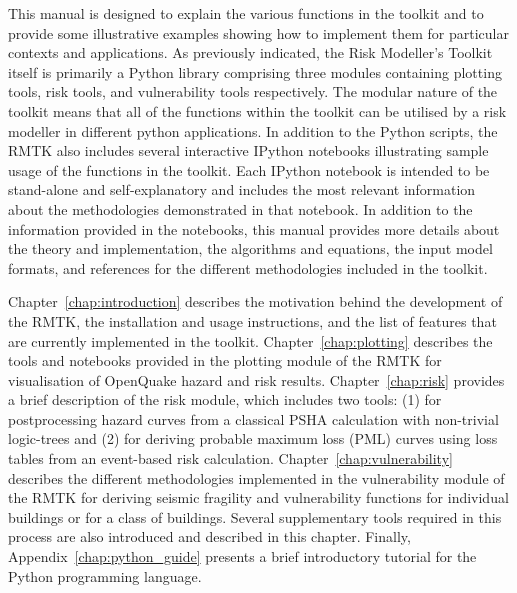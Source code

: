 This manual is designed to explain the various functions in the toolkit and to provide some illustrative examples showing how to implement them for particular contexts and applications. As previously indicated, the Risk Modeller’s Toolkit itself is primarily a Python library comprising three modules containing plotting tools, risk tools, and vulnerability tools respectively. The modular nature of the toolkit means that all of the functions within the toolkit can be utilised by a risk modeller in different python applications. In addition to the Python scripts, the RMTK also includes several interactive IPython notebooks illustrating sample usage of the functions in the toolkit. Each IPython notebook is intended to be stand-alone and self-explanatory and includes the most relevant information about the methodologies demonstrated in that notebook. In addition to the information provided in the notebooks, this manual provides more details about the theory and implementation, the algorithms and equations, the input model formats, and references for the different methodologies included in the toolkit.

Chapter~\ref{chap:introduction} describes the motivation behind the development of the RMTK, the installation and usage instructions, and the list of features that are currently implemented in the toolkit. Chapter~\ref{chap:plotting} describes the tools and notebooks provided in the plotting module of the RMTK for visualisation of OpenQuake hazard and risk results. Chapter~\ref{chap:risk} provides a brief description of the risk module, which includes two tools: (1) for postprocessing hazard curves from a classical PSHA calculation with non-trivial logic-trees and (2) for deriving probable maximum loss (PML) curves using loss tables from an event-based risk calculation. Chapter~\ref{chap:vulnerability} describes the different methodologies implemented in the vulnerability module of the RMTK for deriving seismic fragility and vulnerability functions for individual buildings or for a class of buildings. Several supplementary tools required in this process are also introduced and described in this chapter. Finally, Appendix~\ref{chap:python_guide} presents a brief introductory tutorial for the Python programming language.
